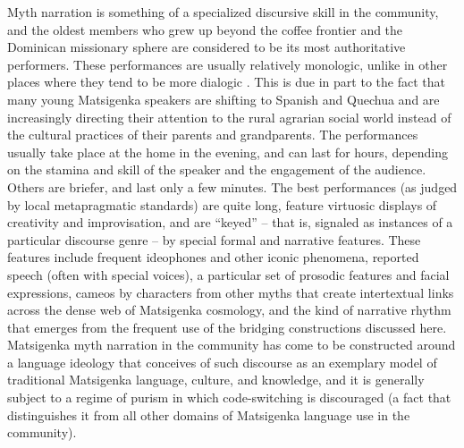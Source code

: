 \documentclass[output=paper]{LSP/langsci}
\begin{document}
Myth narration is something of a specialized discursive skill in the community, and the oldest members who grew up beyond the coffee frontier and the Dominican missionary sphere are considered to be its most authoritative performers. These performances are usually relatively monologic, unlike in other places where they tend to be more dialogic \citep[e.g. among speakers of the nearby and closely related Nanti language;][44]{michael08}. This is due in part to the fact that many young Matsigenka speakers are shifting to Spanish and Quechua and are increasingly directing their attention to the rural agrarian social world instead of the cultural practices of their parents and grandparents. The performances usually take place at the home in the evening, and can last for hours, depending on the stamina and skill of the speaker and the engagement of the audience. Others are briefer, and last only a few minutes. The best performances (as judged by local metapragmatic standards) are quite long, feature virtuosic displays of creativity and improvisation, and are “keyed” \citep[see][]{goffman74,bauman77} – that is, signaled as instances of a particular discourse genre – by special formal and narrative features. These features include frequent ideophones and other iconic phenomena, reported speech (often with special voices), a particular set of prosodic features and facial expressions, cameos by characters from other myths that create intertextual links across the dense web of Matsigenka cosmology, and the kind of narrative rhythm that emerges from the frequent use of the bridging constructions discussed here. Matsigenka myth narration in the community has come to be constructed around a language ideology that conceives of such discourse as an exemplary model \citep{kroskrity98} of traditional Matsigenka language, culture, and knowledge, and it is generally subject to a regime of purism in which code-switching is discouraged (a fact that distinguishes it from all other domains of Matsigenka language use in the community). 
\end{document}

